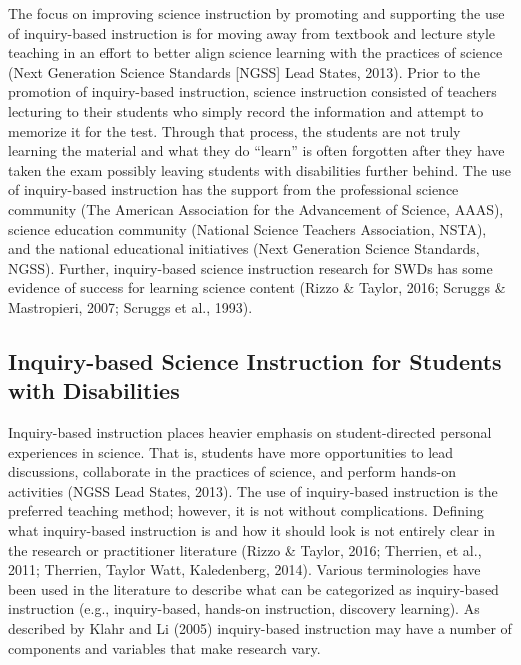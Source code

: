 \documentclass[11.5pt]{sig-alternate} %
\begin{document}
\begin{large}
The focus on improving science instruction by promoting and supporting the use of inquiry-based instruction is for moving away from textbook and lecture style teaching in an effort to better align science learning with the practices of science (Next Generation Science Standards [NGSS] Lead States, 2013). Prior to the promotion of inquiry-based instruction, science instruction consisted of teachers lecturing to their students who simply record the information and attempt to memorize it for the test.  Through that process, the students are not truly learning the material and what they do “learn” is often forgotten after they have taken the exam possibly leaving students with disabilities further behind.  The use of inquiry-based instruction has the support from the professional science community (The American Association for the Advancement of Science, AAAS), science education community (National Science Teachers Association, NSTA), and the national educational initiatives (Next Generation Science Standards, NGSS).  Further, inquiry-based science instruction research for SWDs has some evidence of success for learning science content (Rizzo \& Taylor, 2016; Scruggs \& Mastropieri, 2007; Scruggs et al., 1993).

\subsection*{Inquiry-based Science Instruction for Students with Disabilities}

Inquiry-based instruction places heavier emphasis on student-directed personal experiences in science.  That is, students have more opportunities to lead discussions, collaborate in the practices of science, and perform hands-on activities (NGSS Lead States, 2013).  The use of inquiry-based instruction is the preferred teaching method; however, it is not without complications.  Defining what inquiry-based instruction is and how it should look is not entirely clear in the research or practitioner literature (Rizzo \& Taylor, 2016; Therrien, et al., 2011; Therrien, Taylor Watt, Kaledenberg, 2014).  Various terminologies have been used in the literature to describe what can be categorized as inquiry-based instruction (e.g., inquiry-based, hands-on instruction, discovery learning). As described by Klahr and Li (2005) inquiry-based instruction may have a number of components and variables that make research vary.  


\end{large}
\end{document}

